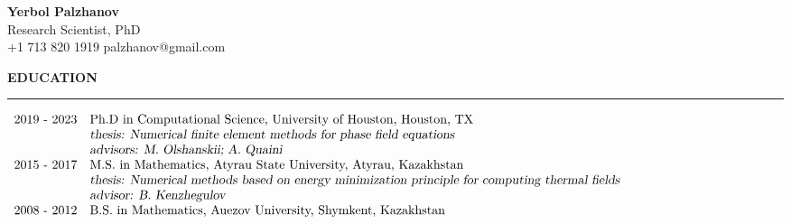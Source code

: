 \documentclass[10pt,letterpaper]{letter}
\newcommand{\gsect}[1]{\textcolor{codepurple}{\textbf{{\Large \uppercase{#1} }}} \\ \hrule}
\begin{document}
	\begin{center}
\textbf{	{\large Yerbol Palzhanov}}\\ Research Scientist, PhD\\
+1 713 820 1919 \quad palzhanov@gmail.com
	\end{center}

\gsect{Education}

$\begin{array}{r l }
	\text{2019 - 2023} & \text{Ph.D in Computational Science, University of Houston, Houston, TX} \\
					   & \textsl{thesis: Numerical finite element methods for phase field equations} \\
					   & \textsl{advisors: M.~Olshanskii; A.~Quaini} \\
	\text{2015 - 2017} & \text{M.S. in Mathematics, Atyrau State University, Atyrau, Kazakhstan}\\
					   & \textsl{thesis: Numerical methods based on energy minimization principle for computing thermal fields} \\
					   & \textsl{advisor: B.~Kenzhegulov} \\
	\text{2008 - 2012} & \text{B.S. in Mathematics, Auezov University, Shymkent, Kazakhstan}
\end{array}$
\end{document}
